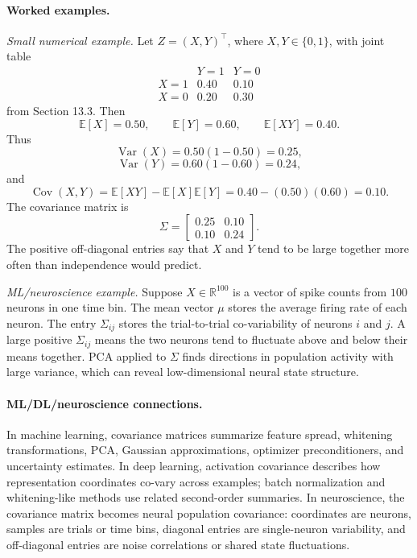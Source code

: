\paragraph{Worked examples.}
\emph{Small numerical example.} Let \(Z=(X,Y)^\top\), where \(X,Y\in\{0,1\}\), with joint table
\[
\begin{array}{c|cc}
&Y=1&Y=0\\
\hline
X=1&0.40&0.10\\
X=0&0.20&0.30
\end{array}
\]
from Section 13.3. Then
\[
\mathbb{E}[X]=0.50,
\qquad
\mathbb{E}[Y]=0.60,
\qquad
\mathbb{E}[XY]=0.40.
\]
Thus
\[
\operatorname{Var}(X)=0.50(1-0.50)=0.25,
\]
\[
\operatorname{Var}(Y)=0.60(1-0.60)=0.24,
\]
and
\[
\operatorname{Cov}(X,Y)=\mathbb{E}[XY]-\mathbb{E}[X]\mathbb{E}[Y]
=0.40-(0.50)(0.60)=0.10.
\]
The covariance matrix is
\[
\Sigma=
\begin{bmatrix}
0.25&0.10\\
0.10&0.24
\end{bmatrix}.
\]
The positive off-diagonal entries say that \(X\) and \(Y\) tend to be large together more often than independence would predict.

\emph{ML/neuroscience example.} Suppose \(X\in\mathbb{R}^{100}\) is a vector of spike counts from \(100\) neurons in one time bin. The mean vector \(\mu\) stores the average firing rate of each neuron. The entry \(\Sigma_{ij}\) stores the trial-to-trial co-variability of neurons \(i\) and \(j\). A large positive \(\Sigma_{ij}\) means the two neurons tend to fluctuate above and below their means together. PCA applied to \(\Sigma\) finds directions in population activity with large variance, which can reveal low-dimensional neural state structure.

\paragraph{ML/DL/neuroscience connections.}
In machine learning, covariance matrices summarize feature spread, whitening transformations, PCA, Gaussian approximations, optimizer preconditioners, and uncertainty estimates. In deep learning, activation covariance describes how representation coordinates co-vary across examples; batch normalization and whitening-like methods use related second-order summaries. In neuroscience, the covariance matrix becomes neural population covariance: coordinates are neurons, samples are trials or time bins, diagonal entries are single-neuron variability, and off-diagonal entries are noise correlations or shared state fluctuations.

